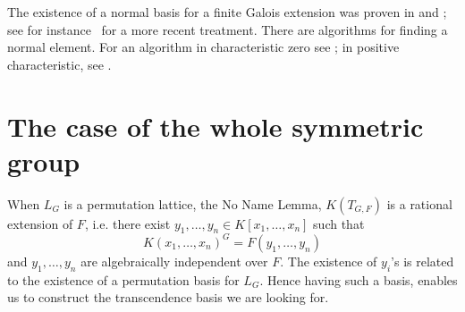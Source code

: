 \documentclass[12pt]{article}
\theoremstyle{plain}
\begin{document}
The existence of a normal basis for a finite Galois extension was
proven in \cite{NoetherNormalBasis} and \cite{Deuring}; see for
instance~\cite[Theorem 6.13.1]{Lang} for a more recent treatment.
There are algorithms for finding a normal element. For an algorithm in
characteristic zero see \cite{Girstmair}; in positive characteristic,
see \cite{Giesbrecht,Poli}.

\section{The case of the whole symmetric group}
 

When $L_G$ is a permutation lattice, the No Name Lemma, $K(T_{G,F})$
is a rational extension of $F$, i.e. there exist $y_1,\ldots,y_n \in
K[x_1, \ldots , x_n]$ such that $$K(x_1, \ldots, x_n)^G =
F(y_1,\ldots,y_n)$$ and $y_1, \ldots, y_n$ are algebraically
independent over $F$.  The existence of $y_i$'s is related to the
existence of a permutation basis for $L_G$. Hence having such a basis,
enables us to construct the transcendence basis we are looking for.

\end{document}
